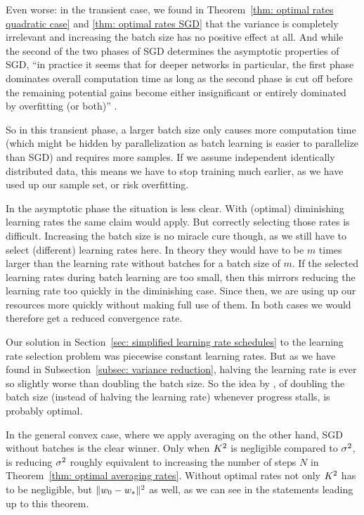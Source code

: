 Even worse: in the transient case, we found in Theorem~\ref{thm:
optimal rates quadratic case} and \ref{thm: optimal rates SGD} that the variance is
completely irrelevant and increasing the batch size has no positive effect at
all. And while the second of the two phases of SGD \parencite[first observed
by][]{darkenFasterStochasticGradient1991} determines the asymptotic properties
of SGD,  ``in practice it seems that for deeper networks in particular, the first
phase dominates overall computation time as long as the second phase is cut off
before the remaining potential gains become either insignificant or entirely
dominated by overfitting (or both)''  
\parencite{sutskeverImportanceInitializationMomentum2013}.

So in this transient phase, a larger batch size only causes more computation
time (which might be hidden by parallelization as batch learning is easier to
parallelize than SGD) and requires more samples. If we assume independent
identically distributed data, this means we have to stop training much earlier, as
we have used up our sample set, or risk overfitting.

In the asymptotic phase the situation is less clear. With (optimal) diminishing
learning rates the same claim would apply. But correctly selecting those rates
is difficult. Increasing the batch size is no miracle cure though, as we still
have to select (different) learning rates here. In theory they would have to
be \(m\) times larger than the learning rate without batches for a batch
size of \(m\). If the selected learning rates during batch learning are too
small, then this mirrors reducing the learning rate too quickly in the diminishing
case. Since then, we are using up our resources more quickly without making full use of
them. In both cases we would therefore get a reduced convergence rate.

Our solution in Section~\ref{sec: simplified learning rate schedules} to the
learning rate selection problem was piecewise constant learning rates. But
as we have found in Subsection~\ref{subsec: variance reduction}, halving the
learning rate is ever so slightly worse than doubling the batch size. So the
idea by \textcite{smithDonDecayLearning2018}, of doubling the batch size
(instead of halving the learning rate) whenever progress stalls, is probably
optimal.

In the general convex case, where we apply averaging on the other hand, SGD
without batches is the clear winner. Only when \(K^2\) is negligible
compared to \(\sigma^2\), is reducing \(\sigma^2\) roughly equivalent to
increasing the number of steps \(N\) in Theorem~\ref{thm: optimal averaging rates}.
Without optimal rates not only \(K^2\) has to be negligible, but
\(\|w_0 -w_*\|^2\) as well, as we can see in the statements leading
up to this theorem.

